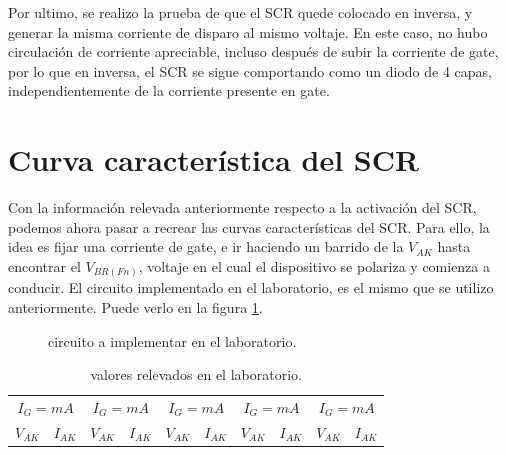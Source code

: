         Por ultimo, se realizo la prueba de que el SCR quede colocado en inversa, y generar la misma corriente de
        disparo al mismo voltaje. En este caso, no hubo circulación de corriente apreciable, incluso después de subir la
        corriente de gate, por lo que en inversa, el SCR se sigue comportando como un diodo de 4 capas,
        independientemente de la corriente presente en gate.

  \section{Curva característica del SCR}
    Con la información relevada anteriormente respecto a la activación del SCR, podemos ahora pasar a recrear las curvas
    características del SCR. Para ello, la idea es fijar una corriente de gate, e ir haciendo un barrido de la $V_{AK}$
    hasta encontrar el $V_{BR(Fn)}$, voltaje en el cual el dispositivo se polariza y comienza a conducir. El circuito
    implementado en el laboratorio, es el mismo que se utilizo anteriormente. Puede verlo en la figura
    \ref{crkt:scr_curvcar_lab}.

    \begin{figure}[!ht]
      \centering
      
      \caption{circuito a implementar en el laboratorio.}
      \label{crkt:scr_curvcar_lab}
    \end{figure}

    \begin{table}[!ht]
      \centering
      \begin{tabular}{c|c|c|c|c|c|c|c|c|c}
        \multicolumn{2}{c|}{$I_G = mA$} & \multicolumn{2}{c|}{$I_G = mA$} & \multicolumn{2}{c|}{$I_G = mA$} & \multicolumn{2}{c|}{$I_G = mA$} & \multicolumn{2}{c}{$I_G = mA$} \\
        $V_{AK}$ & $I_{AK}$ & $V_{AK}$ & $I_{AK}$ & $V_{AK}$ & $I_{AK}$ & $V_{AK}$ & $I_{AK}$ & $V_{AK}$ & $I_{AK}$ \\ \hline
        
      \end{tabular}
      \caption{valores relevados en el laboratorio.}
      \label{tab:scr_curvcar_lab}
    \end{table}

